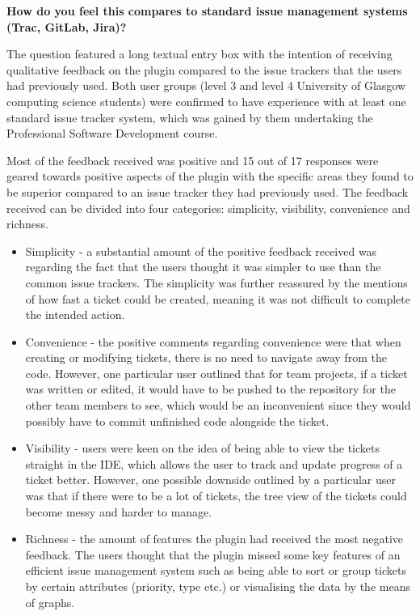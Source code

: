 \documentclass{4thYearProject}
\begin{document}
\textbf{How do you feel this compares to standard issue management systems (Trac, GitLab, Jira)?}

The question featured a long textual entry box with the intention of receiving qualitative feedback on the plugin compared to the issue trackers that the users had previously used. Both user groups (level 3 and level 4 University of Glasgow computing science students) were confirmed to have experience with at least one standard issue tracker system, which was gained by them undertaking the Professional Software Development course.

Most of the feedback received was positive and 15 out of 17 responses were geared towards positive aspects of the plugin with the specific areas they found to be superior compared to an issue tracker they had previously used. The feedback received can be divided into four categories: simplicity, visibility, convenience and richness.

\begin{itemize}
\item Simplicity - a substantial amount of the positive feedback received was regarding the fact that the users thought it was simpler to use than the common issue trackers. The simplicity was further reassured by the mentions of how fast a ticket could be created, meaning it was not difficult to complete the intended action.
\item Convenience - the positive comments regarding convenience were that when creating or modifying tickets, there is no need to navigate away from the code. However, one particular user outlined that for team projects, if a ticket was written or edited, it would have to be pushed to the repository for the other team members to see, which would be an inconvenient since they would possibly have to commit unfinished code alongside the ticket.
\item Visibility - users were keen on the idea of being able to view the tickets straight in the IDE, which allows the user to track and update progress of a ticket better. However, one possible downside outlined by a particular user was that if there were to be a lot of tickets, the tree view of the tickets could become messy and harder to manage.  
\item Richness - the amount of features the plugin had received the most negative feedback. The users thought that the plugin missed some key features of an efficient issue management system such as being able to sort or group tickets by certain attributes (priority, type etc.) or visualising the data by the means of graphs. 
\end{itemize}
\end{document}
